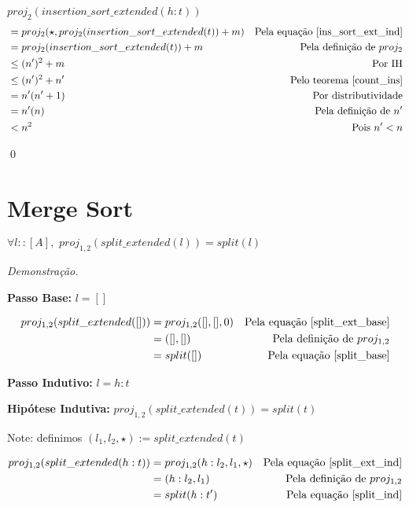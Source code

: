 \documentclass[12pt, oneside, a4paper,english,brazil]{abntex2}
\begin{document}
$proj_{2}(insertion\_sort\_extended(h : t))$
\begin{align*}
   &= proj_{2}(\star, proj_{2}(insertion\_sort\_extended(t)) + m) &\text{Pela equa\c{c}\~ao \ref{ins_sort_ext_ind}} \\
                                             &= proj_{2}(insertion\_sort\_extended(t)) + m &\text{Pela defini\c{c}\~ao de } proj_{2} \\
   &\le (n')^{2} + m &\text{Por IH} \\
   &\le (n')^{2} + n' &\text{Pelo teorema \ref{count_ins}} \\
   &=n'(n' + 1) &\text{Por distributividade} \\
   &=n'(n) &\text{Pela defini\c{c}\~ao de $n'$} \\
  &< n^{2} &\text{Pois $n' < n$}
\end{align*}

\qed

\section{Merge Sort}

\begin{teorema}
  $\forall l :: [A], \,\, proj_{1,2}(split\_extended(l)) = split(l)$
\end{teorema}

\noindent \textit{Demonstra\c{c}\~ao.}

\textbf{Passo Base: } $l = []$

\begin{align*}
  proj_{1,2}(split\_extended([])) &= proj_{1,2}([], [], 0) &\text{Pela equa\c{c}\~ao \ref{split_ext_base}} \\
                                &= ([],[]) &\text{Pela defini\c{c}\~ao de $proj_{1,2}$} \\
  &= split([]) &\text{Pela equa\c{c}\~ao \ref{split_base}}
\end{align*}

\textbf{Passo Indutivo: } $l = h : t$

\textbf{Hip\'otese Indutiva: } $proj_{1,2}(split\_extended(t)) = split(t)$

Note: definimos $(l_{1}, l_{2}, \star) := split\_extended(t)$

\begin{align*}
  proj_{1,2}(split\_extended(h : t)) &= proj_{1,2}(h : l_{2}, l_{1}, \star) &\text{Pela equa\c{c}\~ao \ref{split_ext_ind}} \\
                                     &= (h : l_{2}, l_{1}) &\text{Pela defini\c{c}\~ao de $proj_{1,2}$} \\
  &= split(h : t') &\text{Pela equa\c{c}\~ao \ref{split_ind}}
\end{align*}
\end{document}
